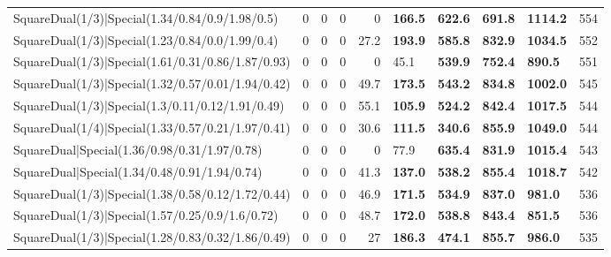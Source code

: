 \begin{tabular}{lrrrrllllr}
 SquareDual(1/3)|Special(1.34/0.84/0.9/1.98/0.5)         &          0   &          0   &          0   &             0   & \textbf{166.5} & \textbf{622.6} & \textbf{691.8} & \textbf{1114.2} &          554 \\
 SquareDual(1/3)|Special(1.23/0.84/0.0/1.99/0.4)         &          0   &          0   &          0   &            27.2 & \textbf{193.9} & \textbf{585.8} & \textbf{832.9} & \textbf{1034.5} &          552 \\
 SquareDual(1/3)|Special(1.61/0.31/0.86/1.87/0.93)       &          0   &          0   &          0   &             0   & 45.1           & \textbf{539.9} & \textbf{752.4} & \textbf{890.5}  &          551 \\
 SquareDual(1/3)|Special(1.32/0.57/0.01/1.94/0.42)       &          0   &          0   &          0   &            49.7 & \textbf{173.5} & \textbf{543.2} & \textbf{834.8} & \textbf{1002.0} &          545 \\
 SquareDual(1/3)|Special(1.3/0.11/0.12/1.91/0.49)        &          0   &          0   &          0   &            55.1 & \textbf{105.9} & \textbf{524.2} & \textbf{842.4} & \textbf{1017.5} &          544 \\
 SquareDual(1/4)|Special(1.33/0.57/0.21/1.97/0.41)       &          0   &          0   &          0   &            30.6 & \textbf{111.5} & \textbf{340.6} & \textbf{855.9} & \textbf{1049.0} &          544 \\
 SquareDual|Special(1.36/0.98/0.31/1.97/0.78)            &          0   &          0   &          0   &             0   & 77.9           & \textbf{635.4} & \textbf{831.9} & \textbf{1015.4} &          543 \\
 SquareDual|Special(1.34/0.48/0.91/1.94/0.74)            &          0   &          0   &          0   &            41.3 & \textbf{137.0} & \textbf{538.2} & \textbf{855.4} & \textbf{1018.7} &          542 \\
 SquareDual(1/3)|Special(1.38/0.58/0.12/1.72/0.44)       &          0   &          0   &          0   &            46.9 & \textbf{171.5} & \textbf{534.9} & \textbf{837.0} & \textbf{981.0}  &          536 \\
 SquareDual(1/3)|Special(1.57/0.25/0.9/1.6/0.72)         &          0   &          0   &          0   &            48.7 & \textbf{172.0} & \textbf{538.8} & \textbf{843.4} & \textbf{851.5}  &          536 \\
 SquareDual(1/3)|Special(1.28/0.83/0.32/1.86/0.49)       &          0   &          0   &          0   &            27   & \textbf{186.3} & \textbf{474.1} & \textbf{855.7} & \textbf{986.0}  &          535 \\

\end{tabular}
